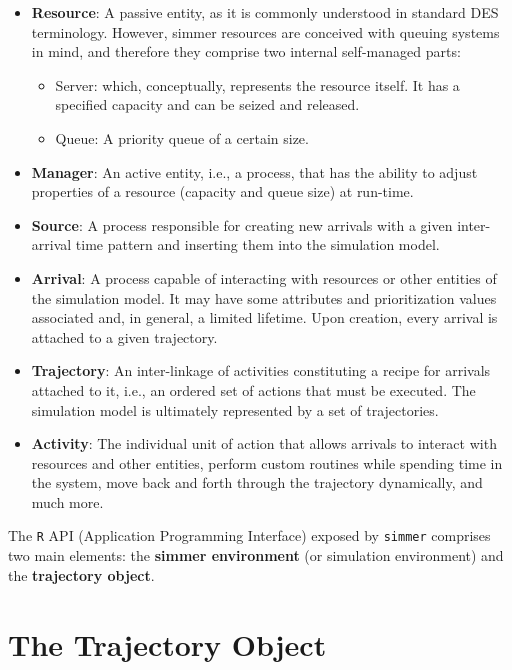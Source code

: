 \documentclass[
]{book}
\providecommand{\tightlist}{%
  \setlength{\itemsep}{0pt}\setlength{\parskip}{0pt}}
\begin{document}
\begin{itemize}
\item
  \textbf{Resource}: A passive entity, as it is commonly understood in standard DES terminology. However, simmer resources are conceived with queuing systems in mind, and therefore they comprise two internal self-managed parts:

  \begin{itemize}
  \tightlist
  \item
    Server: which, conceptually, represents the resource itself. It has a specified capacity and can be seized and released.
  \item
    Queue: A priority queue of a certain size.
  \end{itemize}
\item
  \textbf{Manager}: An active entity, i.e., a process, that has the ability to adjust properties of a resource (capacity and queue size) at run-time.
\item
  \textbf{Source}: A process responsible for creating new arrivals with a given inter-arrival time pattern and inserting them into the simulation model.
\item
  \textbf{Arrival}: A process capable of interacting with resources or other entities of the simulation model. It may have some attributes and prioritization values associated and, in general, a limited lifetime. Upon creation, every arrival is attached to a given trajectory.
\item
  \textbf{Trajectory}: An inter-linkage of activities constituting a recipe for arrivals attached to it, i.e., an ordered set of actions that must be executed. The simulation model is ultimately represented by a set of trajectories.
\item
  \textbf{Activity}: The individual unit of action that allows arrivals to interact with resources and other entities, perform custom routines while spending time in the system, move back and forth through the trajectory dynamically, and much more.
\end{itemize}

The \texttt{R} API (Application Programming Interface) exposed by \texttt{simmer} comprises two main elements: the \textbf{simmer environment} (or simulation environment) and the \textbf{trajectory object}.

\hypertarget{the-trajectory-object}{%
\section{The Trajectory Object}\label{the-trajectory-object}}
\end{document}
